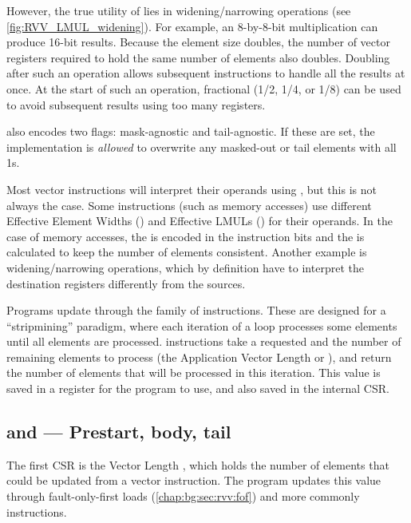 However, the true utility of  lies in widening/narrowing operations (see \cref{fig:RVV_LMUL_widening}).
For example, an 8-by-8-bit multiplication can produce 16-bit results.
Because the element size doubles, the number of vector registers required to hold the same number of elements also doubles.
Doubling  after such an operation allows subsequent instructions to handle all the results at once.
At the start of such an operation, fractional  (1/2, 1/4, or 1/8) can be used to avoid subsequent results using too many registers.

 also encodes two flags: mask-agnostic and tail-agnostic.
If these are set, the implementation is \emph{allowed} to overwrite any masked-out or tail elements with all 1s.

Most vector instructions will interpret their operands using , but this is not always the case.
Some instructions (such as memory accesses) use different Effective Element Widths () and Effective LMULs () for their operands.
In the case of memory accesses, the  is encoded in the instruction bits and the  is calculated to keep the number of elements consistent.
Another example is widening/narrowing operations, which by definition have to interpret the destination registers differently from the sources.

Programs update  through the  family of instructions.
These are designed for a ``stripmining'' paradigm, where each iteration of a loop processes some elements until all elements are processed.
 instructions take a requested  and the number of remaining elements to process (the Application Vector Length or ), and return the number of elements that will be processed in this iteration.
This value is saved in a register for the program to use, and also saved in the internal  CSR.

\subsection{ and  --- Prestart, body, tail}\label{chap:bg:subsec:vlvstart}
The first CSR is the Vector Length , which holds the number of elements that could be updated from a vector instruction.
The program updates this value through fault-only-first loads (\cref{chap:bg:sec:rvv:fof}) and more commonly  instructions.

